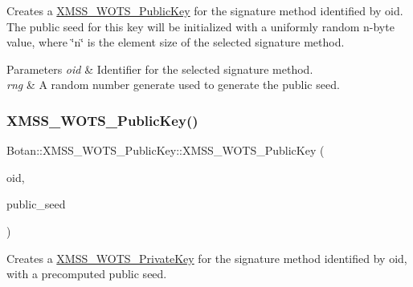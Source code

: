 Creates a \hyperlink{class_botan_1_1_x_m_s_s___w_o_t_s___public_key}{X\+M\+S\+S\+\_\+\+W\+O\+T\+S\+\_\+\+Public\+Key} for the signature method identified by oid. The public seed for this key will be initialized with a uniformly random n-\/byte value, where \char`\"{}n\char`\"{} is the element size of the selected signature method.


\begin{DoxyParams}{Parameters}
{\em oid} & Identifier for the selected signature method. \\
\hline
{\em rng} & A random number generate used to generate the public seed. \\
\hline
\end{DoxyParams}
\mbox{\label{class_botan_1_1_x_m_s_s___w_o_t_s___public_key_a99e8be1233998e9375321051722fa40e}} 
\subsubsection{\texorpdfstring{X\+M\+S\+S\+\_\+\+W\+O\+T\+S\+\_\+\+Public\+Key()}{XMSS\_WOTS\_PublicKey()}\hspace{0.1cm}{\footnotesize\ttfamily [3/6]}}
{\footnotesize\ttfamily Botan\+::\+X\+M\+S\+S\+\_\+\+W\+O\+T\+S\+\_\+\+Public\+Key\+::\+X\+M\+S\+S\+\_\+\+W\+O\+T\+S\+\_\+\+Public\+Key (\begin{DoxyParamCaption}\item[{X\+M\+S\+S\+\_\+\+W\+O\+T\+S\+\_\+\+Parameters\+::ots\+\_\+algorithm\+\_\+t}]{oid,  }\item[{secure\+\_\+vector$<$ uint8\+\_\+t $>$}]{public\+\_\+seed }\end{DoxyParamCaption})\hspace{0.3cm}{\ttfamily [inline]}}

Creates a \hyperlink{class_botan_1_1_x_m_s_s___w_o_t_s___private_key}{X\+M\+S\+S\+\_\+\+W\+O\+T\+S\+\_\+\+Private\+Key} for the signature method identified by oid, with a precomputed public seed.


